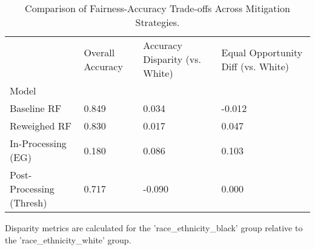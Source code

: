 \begin{table}[htbp]
\centering
\caption{Comparison of Fairness-Accuracy Trade-offs Across Mitigation Strategies.}
\label{tab:mitigation-comparison}
\begin{tabular}{llll}
\toprule
 & Overall Accuracy & Accuracy Disparity (vs. White) & Equal Opportunity Diff (vs. White) \\
Model &  &  &  \\
\midrule
Baseline RF & 0.849 & 0.034 & -0.012 \\
Reweighed RF & 0.830 & 0.017 & 0.047 \\
In-Processing (EG) & 0.180 & 0.086 & 0.103 \\
Post-Processing (Thresh) & 0.717 & -0.090 & 0.000 \\
\bottomrule
\end{tabular}

\begin{tablenotes}[flushleft]
\item \small{Disparity metrics are calculated for the 'race_ethnicity_black' group relative to the 'race_ethnicity_white' group.}
\end{tablenotes}
\end{table}